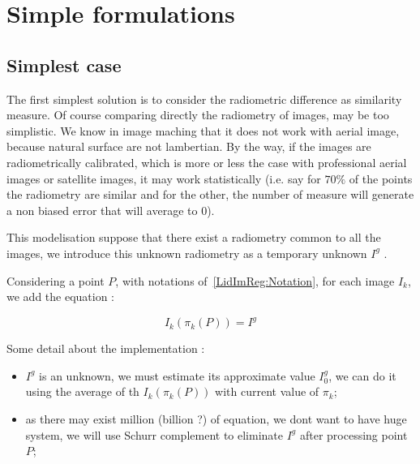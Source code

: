 
\section{Simple formulations}

\label{LIR:SimplF}


\subsection{Simplest case}

The first simplest solution is to consider the radiometric difference as
similarity measure.
Of course comparing directly the radiometry of images, may be too simplistic.
We know in image maching that it does not work with aerial image,  because natural
surface are not lambertian.   By the way, if the images
are radiometrically calibrated, which is more or less the case with professional
aerial images or satellite images, it may work statistically (i.e. say for $70\%$
of the points the radiometry are similar and for the other, the number of measure will
generate a non biased error that will average to $0$).


This modelisation suppose that there exist a radiometry 
common to all the images, we introduce this unknown radiometry as a 
temporary unknown $I^g$ .

Considering a point $P$, with notations of~\ref{LidImReg:Notation},
for each image $I_k$, we add  the equation :

\begin{equation}
    I_k(\pi_k(P)) = I^g \label{LIR:Eq1Point}
\end{equation}

Some detail about the implementation :

\begin{itemize}
    \item $I^g$ is an unknown, we must estimate its approximate value $I^g_0$,
          we can do it using the average of th $I_k(\pi_k(P))$ with
          current value of $\pi_k$;

    \item as there may exist million (billion ?) of equation, we dont
          want to have huge system, we will use Schurr complement to eliminate
          $I^g$ after processing point $P$;
\end{itemize}

